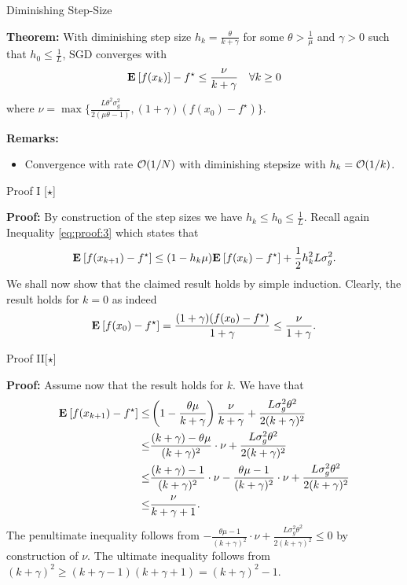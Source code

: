 \documentclass[9pt]{beamer}
\begin{document}
\begin{frame}{Diminishing Step-Size}

  \textbf{Theorem:}
  With diminishing step size $h_k= \frac{\theta}{k+\gamma}$ for some $\theta>\frac{1}{\mu}$ and $\gamma>0$ such that $h_0\leq \frac 1L$, SGD converges with
  \[
    \mathbf{E}_{} \left[ f(x_k) \right] - f^\star \leq \frac{\nu}{k+\gamma} \quad \forall k\geq 0
  \]
  where $\nu=\max \{ \tfrac{L \theta^2\sigma^2_g}{2(\mu\theta-1)}, (1+\gamma)( f(x_0)-f^\star)\}$.

  \vfill

\textbf{Remarks:}
\begin{itemize}
\item Convergence with rate $\mathcal O(1/N)$ with diminishing stepsize with $h_k=\mathcal O(1/k)$.
\end{itemize}
\end{frame}

\begin{frame}{Proof I [$\star$]}

  \textbf{Proof:}
  By construction of the step sizes we have $h_k\leq h_0 \leq \frac{1}{L}$. Recall again Inequality \eqref{eq:proof:3} which states that
  \[
    \mathbf{E}_{} \left[ f(x_{k+1})-f^\star \right] \leq (1-h_k\mu)\mathbf{E}_{} \left[ f(x_k)-f^\star \right]+ \frac 12 h_k^2 L \sigma_g^2.
  \]
  We shall now show that the claimed result holds by simple induction. Clearly, the result holds for $k=0$ as indeed
  \[
    \mathbf{E}_{} \left[ f(x_{0})-f^\star \right] = \frac{(1+\gamma)(f(x_0)-f^\star)}{1+\gamma}\leq \frac{\nu}{1+\gamma}.
  \]
  
\end{frame}

\begin{frame}{Proof II[$\star$]}

  \textbf{Proof:}
  Assume now that the result holds for $k$. We have that
  \begin{align*}
    \mathbf{E}_{} \left[ f(x_{k+1})-f^\star \right] \leq & \left(1-\frac{\theta\mu}{k+\gamma}\right) \frac{\nu}{k+\gamma}+\frac {L \sigma_g^2\theta^2}{2(k+\gamma)^2}\\
    \leq & \frac{(k+\gamma)-\theta\mu}{(k+\gamma)^2}\cdot \nu+\frac {L \sigma_g^2\theta^2}{2(k+\gamma)^2}\\
    \leq & \frac{(k+\gamma)-1}{(k+\gamma)^2}\cdot \nu-\frac{\theta\mu-1}{(k+\gamma)^2}\cdot \nu+\frac {L \sigma_g^2\theta^2}{2(k+\gamma)^2}\\
    \leq & \frac{\nu}{k+\gamma+1}.
  \end{align*}
  The penultimate inequality follows from $-\frac{\theta\mu-1}{(k+\gamma)^2}\cdot \nu+\frac {L \sigma_g^2\theta^2}{2(k+\gamma)^2}\leq 0$ by construction of $\nu$. The ultimate inequality follows from $(k+\gamma)^2\geq (k+\gamma-1)(k+\gamma+1) = (k+\gamma)^2-1$.
\end{frame}
\end{document}
